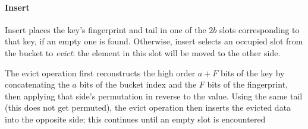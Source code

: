 \documentclass[letterpaper,twocolumn,10pt]{article}
\newcommand{\TCF}{SCF}
\newcommand{\TCF}{TCF}
\begin{document}


\paragraph{Insert}
Insert places the key's fingerprint and tail in one of the $2b$ slots corresponding to that key, if an empty one is found.
Otherwise, insert selects an occupied slot from the bucket to {\em evict}: the element in this slot will be moved to the other side. %

The evict operation first reconstructs the high order $a + F$ bits of the key by concatenating the $a$ bits of the bucket index and the $F$ bits of the fingerprint, then applying that side's permutation in reverse to the value. %
Using the same tail (this does not get permuted), the evict operation then inserts the evicted data into the opposite side;
this continues until an empty slot is encountered %

\end{document}
